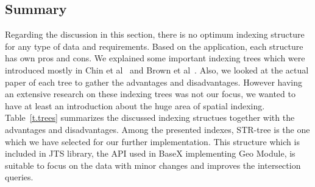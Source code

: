 \documentclass[a4paper,12pt]{article}
\begin{document}
\subsection{Summary}
Regarding the discussion in this section, there is no optimum indexing structure for any type of data and requirements. Based on the application, each structure has own pros and cons. We explained some important indexing trees which were introduced mostly in Chin et al~\cite{survey} and Brown et al~\cite{tree-basedindexes}. Also, we looked at the actual paper of each tree to gather the advantages and disadvantages. However having an extensive research on these indexing trees was not our focus, we wanted to have at least an introduction about the huge area of spatial indexing. 
Table~\ref{t.trees} summarizes the discussed indexing structues together with the advantages and disadvantages. 
Among the presented indexes, STR-tree is the one which we have selected for our further implementation.
This structure which is included in JTS library, the API used in BaseX implementing Geo Module, is suitable to focus on the data with minor changes and improves the intersection queries. %
\newpage
\end{document}
